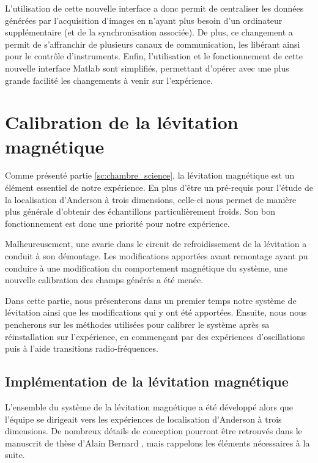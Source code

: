 L'utilisation de cette nouvelle interface a donc permit de centraliser les données générées par l'acquisition d'images en n'ayant plus besoin d'un ordinateur supplémentaire (et de la synchronisation associée). De plus, ce changement a permit de s'affranchir de plusieurs canaux de communication, les libérant ainsi pour le contrôle d'instruments. Enfin, l'utilisation et le fonctionnement de cette nouvelle interface Matlab sont simplifiés, permettant d'opérer avec une plus grande facilité les changements à venir sur l'expérience.











\section{Calibration de la lévitation magnétique}
\label{sc:levitation}
Comme présenté partie \ref{sc:chambre_science}, la lévitation magnétique est un élément essentiel de notre expérience. En plus d'être un pré-requis pour l'étude de la localisation d'Anderson à trois dimensions, celle-ci nous permet de manière plus générale d'obtenir des échantillons particulièrement froids. Son bon fonctionnement est donc une priorité pour notre expérience.

Malheureusement, une avarie dans le circuit de refroidissement de la lévitation a conduit à son démontage. Les modifications apportées avant remontage ayant pu conduire à une modification du comportement magnétique du système, une nouvelle calibration des champs générés a été menée.

Dans cette partie, nous présenterons dans un premier temps notre système de lévitation ainsi que les modifications qui y ont été apportées. Ensuite, nous nous pencherons sur les méthodes utilisées pour calibrer le système après sa réinstallation sur l'expérience, en commençant par des expériences d'oscillations puis à l'aide transitions radio-fréquences.




\subsection{Implémentation de la lévitation magnétique}

L'ensemble du système de la lévitation magnétique a été développé alors que l'équipe se dirigeait vers les expériences de localisation d'Anderson à trois dimensions. De nombreux détails de conception pourront être retrouvés dans le manuscrit de thèse d'Alain Bernard \citep{bernard2010transport}, mais rappelons les éléments nécessaires à la suite.

